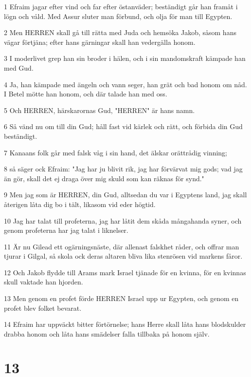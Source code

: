 \par 1 Efraim jagar efter vind och far efter östanväder; beständigt går han framåt i lögn och våld. Med Assur sluter man förbund, och olja för man till Egypten.
\par 2 Men HERREN skall gå till rätta med Juda och hemsöka Jakob, såsom hans vägar förtjäna; efter hans gärningar skall han vedergälla honom.
\par 3 I moderlivet grep han sin broder i hälen, och i sin mandomskraft kämpade han med Gud.
\par 4 Ja, han kämpade med ängeln och vann seger, han grät och bad honom om nåd. I Betel mötte han honom, och där talade han med oss.
\par 5 Och HERREN, härskarornas Gud, "HERREN" är hans namn.
\par 6 Så vänd nu om till din Gud; håll fast vid kärlek och rätt, och förbida din Gud beständigt.
\par 7 Kanaans folk går med falsk våg i sin hand, det älskar orättrådig vinning;
\par 8 så säger ock Efraim: "Jag har ju blivit rik, jag har förvärvat mig gods; vad jag än gör, skall det ej draga över mig skuld som kan räknas för synd."
\par 9 Men jag som är HERREN, din Gud, alltsedan du var i Egyptens land, jag skall återigen låta dig bo i tält, likasom vid eder högtid.
\par 10 Jag har talat till profeterna, jag har låtit dem skåda mångahanda syner, och genom profeterna har jag talat i liknelser.
\par 11 Är nu Gilead ett ogärningsnäste, där allenast falskhet råder, och offrar man tjurar i Gilgal, så skola ock deras altaren bliva lika stenrösen vid markens fåror.
\par 12 Och Jakob flydde till Arams mark Israel tjänade för en kvinna, för en kvinnas skull vaktade han hjorden.
\par 13 Men genom en profet förde HERREN Israel upp ur Egypten, och genom en profet blev folket bevarat.
\par 14 Efraim har uppväckt bitter förtörnelse; hans Herre skall låta hans blodskulder drabba honom och låta hans smädelser falla tillbaka på honom själv.

\chapter{13}

